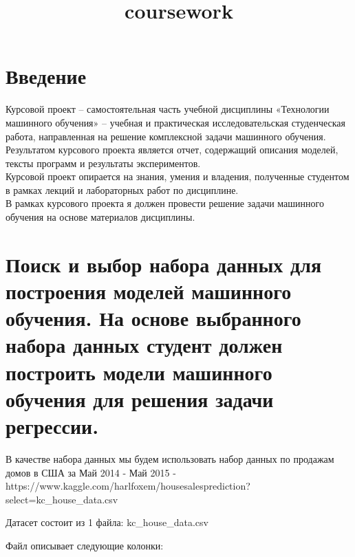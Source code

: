\documentclass[11pt]{report}
\title{coursework}
\begin{document}
	\tableofcontents   
    \hypersetup{
      breaklinks=true,  %
      colorlinks=true,
      urlcolor=urlcolor,
      linkcolor=linkcolor,
      citecolor=citecolor,
      }
		\pagebreak
	  \chapter{Введение}
	  \qquad Курсовой проект – самостоятельная часть учебной дисциплины «Технологии машинного обучения» – учебная и практическая исследовательская студенческая работа, направленная на решение комплексной задачи машинного обучения. Результатом курсового проекта является отчет, содержащий описания моделей, тексты программ и результаты экспериментов. \\
	\qquad Курсовой проект опирается на знания, умения и владения, полученные студентом в рамках лекций и лабораторных работ по дисциплине. \\
	\qquad В рамках курсового проекта я должен провести решение задачи машинного обучения на основе материалов дисциплины.

\chapter{Поиск и выбор набора данных для построения моделей машинного
обучения. На основе выбранного набора данных студент должен построить
модели машинного обучения для решения задачи
регрессии.}

    В качестве набора данных мы будем использовать набор данных по продажам
домов в США за Май 2014 - Май 2015 -
https://www.kaggle.com/harlfoxem/housesalesprediction?select=kc\_house\_data.csv

Датасет состоит из 1 файла: kc\_house\_data.csv

Файл описывает следующие колонки:
\end{document}
